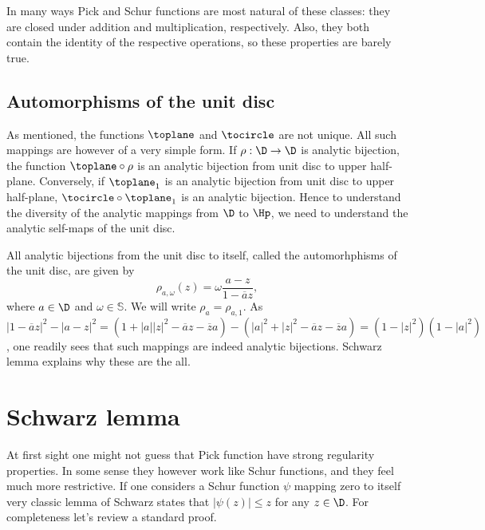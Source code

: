 In many ways Pick and Schur functions are most natural of these classes: they are closed under addition and multiplication, respectively. Also, they both contain the identity of the respective operations, so these properties are barely true.

\subsection{Automorphisms of the unit disc}

As mentioned, the functions $\toplane$ and $\tocircle$ are not unique. All such mappings are however of a very simple form. If $\rho : \D \to \D$ is analytic bijection, the function $\toplane \circ \rho$ is an analytic bijection from unit disc to upper half-plane. Conversely, if $\toplane_{1}$ is an analytic bijection from unit disc to upper half-plane, $\tocircle \circ \toplane_{1}$ is an analytic bijection. Hence to understand the diversity of the analytic mappings from $\D$ to $\Hp$, we need to understand the analytic self-maps of the unit disc.

All analytic bijections from the unit disc to itself, called the automorhphisms of the unit disc, are given by
\[
	\rho_{a, \omega}(z) = \omega \frac{a - z}{1 - \overline{a} z},
\]
where $a \in \D$ and $\omega \in \mathbb{S}$. We will write $\rho_{a} = \rho_{a, 1}$. As $|1 - \overline{a} z|^{2} - |a - z|^{2} = (1 + |a||z|^{2} - \overline{a} z - \overline{z} a) - (|a|^2 + |z|^2 -\overline{a} z - \overline{z} a ) = (1 - |z|^2) (1 - |a|^2)$, one readily sees that such mappings are indeed analytic bijections. Schwarz lemma explains why these are the all.

\section{Schwarz lemma}

At first sight one might not guess that Pick function have strong regularity properties. In some sense they however work like Schur functions, and they feel much more restrictive. If one considers a Schur function $\psi$ mapping zero to itself very classic lemma of Schwarz states that $|\psi(z)| \leq z$ for any $z \in \D$. For completeness let's review a standard proof.

